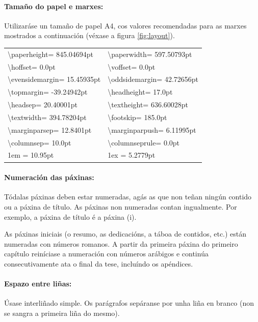 \paragraph{Tamaño do papel e marxes:} Utilizaráse un tamaño de papel A4, cos valores recomendadas para as marxes mostrados a continuación (véxase a figura \ref{fig:layout}).

\begin{center}
\begin{tabular}{ l l }
\textbackslash paperheight= 845.04694pt & \textbackslash paperwidth= 597.50793pt \\ 
\textbackslash hoffset= 0.0pt & \textbackslash voffset= 0.0pt \\
\textbackslash evensidemargin= 15.45935pt & \textbackslash oddsidemargin= 42.72656pt \\
\textbackslash topmargin= -39.24942pt & \textbackslash headheight= 17.0pt \\
\textbackslash headsep= 20.40001pt & \textbackslash textheight= 636.60028pt \\
\textbackslash textwidth= 394.78204pt & \textbackslash footskip= 185.0pt \\
\textbackslash marginparsep= 12.8401pt & \textbackslash marginparpush= 6.11995pt \\
\textbackslash columnsep= 10.0pt & \textbackslash columnseprule= 0.0pt \\
1em = 10.95pt  & 1ex = 5.2779pt \\
\end{tabular}
\end{center}


\paragraph{Numeración das páxinas:} Tódalas páxinas deben estar numeradas, agás as que non teñan ningún contido ou a páxina de título. As páxinas non numeradas contan ingualmente. Por exemplo, a páxina de título é a  páxina (i).

As páxinas iniciais (o resumo, as dedicacións, a táboa de contidos, etc.) están numeradas con números romanos.  A partir da primeira páxina do primeiro capítulo reiníciase a numeración con números arábigos e continúa consecutivamente ata o final da tese, incluíndo os apéndices.

\paragraph{Espazo entre liñas:} Úsase interliñado simple.  Os parágrafos sepáranse por unha liña en branco (non se sangra a primeira liña do mesmo). 

